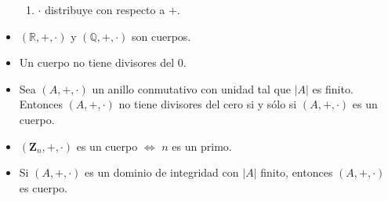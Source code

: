 \documentclass[letterpaper,10pt]{article}
\newcommand{\Q}{\mathbb Q}
\newcommand{\R}{\mathbb R}
\theoremstyle{plain}
\begin{document}
\begin{framed}
\begin{multicols}{2}
\begin{itemize}
\begin{enumerate}
                    \item $\cdot $ distribuye con respecto a $+$. 
                \end{enumerate}
            \item $(\R,+,\cdot)$ y $(\Q,+,\cdot)$ son cuerpos.
            \item Un cuerpo no tiene divisores del 0.
            \item Sea $(A,+,\cdot)$ un anillo conmutativo con unidad tal que $|A|$ es finito. Entonces $(A,+,\cdot)$ no tiene divisores del cero si y sólo si $(A,+,\cdot)$ es un cuerpo.
            \item $(\mathbf{Z}_n, +, \cdot)$ es un cuerpo $\iff$ $n$ es un primo.
            \item Si $(A,+,\cdot)$ es un dominio de integridad con $|A|$ finito, entonces $(A,+,\cdot)$ es cuerpo.
        \end{itemize}
    \end{multicols}
\end{framed}
\end{document}
